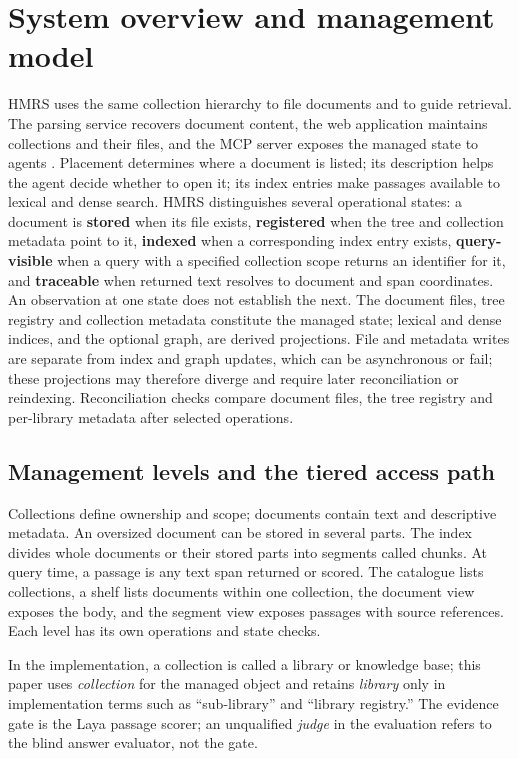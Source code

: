 \section{System overview and management model}
\label{sec:system}

HMRS uses the same collection hierarchy to file documents and to guide
retrieval. The parsing service recovers document content, the web application
maintains collections and their files, and the MCP server exposes the managed
state to agents \cite{mcp}. Placement determines where a document is listed;
its description helps the agent decide whether to open it; its index entries
make passages available to lexical and dense search. HMRS distinguishes
several operational states: a document is \textbf{stored} when its file exists,
\textbf{registered} when the tree and collection metadata point to it,
\textbf{indexed} when a corresponding index entry exists, \textbf{query-visible} when a query with a specified collection scope
returns an identifier for it, and \textbf{traceable} when returned text
resolves to document and span coordinates. An observation at one
state does not establish the next. The document files, tree registry and
collection metadata constitute the managed state; lexical and dense indices,
and the optional graph, are derived projections. File and metadata writes are separate from index and graph updates, which
can be asynchronous or fail; these projections may therefore diverge and
require later reconciliation or reindexing.
Reconciliation checks compare document files, the tree registry and
per-library metadata after selected operations.

\subsection{Management levels and the tiered access path}
\label{sec:levels}

Collections define ownership and scope; documents contain text and
descriptive metadata. An oversized document can be stored in several parts. The index divides
whole documents or their stored parts into segments called chunks. At query time, a passage is any
text span returned or scored. The catalogue lists collections, a shelf lists documents within one
collection, the document view exposes the body, and the segment view exposes
passages with source references. Each level has its own operations and
state checks.

In the implementation, a collection is called a library or knowledge base;
this paper uses \emph{collection} for the managed object and retains
\emph{library} only in implementation terms such as ``sub-library'' and
``library registry.'' The evidence gate is the Laya passage scorer; an
unqualified \emph{judge} in the evaluation refers to the blind answer
evaluator, not the gate.

